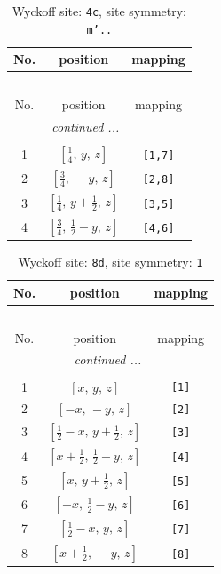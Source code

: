 \documentclass[fleqn,8pt]{jsarticle}
\begin{document}
\renewcommand{\arraystretch}{1.2}
\begin{longtable}{ccc}
\caption{Wyckoff site: {\tt 4c}, site symmetry: {\tt m'..}}
 \\
 \hline \hline
No. & position & mapping \\ \hline \endfirsthead

\multicolumn{2}{l}{\tablename\ \thetable{}} \\
 \hline \hline
No. & position & mapping \\ \hline \endhead

 \hline \hline
\multicolumn{2}{r}{\footnotesize\it continued ...} \\ \endfoot

 \hline \hline
\multicolumn{2}{r}{} \\ \endlastfoot

1 & $\left[ \frac{1}{4},\, y,\, z \right]$ & {\tt [1,7]} \\ \hline
2 & $\left[ \frac{3}{4},\, - y,\, z \right]$ & {\tt [2,8]} \\ \hline
3 & $\left[ \frac{1}{4},\, y + \frac{1}{2},\, z \right]$ & {\tt [3,5]} \\ \hline
4 & $\left[ \frac{3}{4},\, \frac{1}{2} - y,\, z \right]$ & {\tt [4,6]} \\
\end{longtable}
\renewcommand{\arraystretch}{1.2}
\begin{longtable}{ccc}
\caption{Wyckoff site: {\tt 8d}, site symmetry: {\tt 1}}
 \\
 \hline \hline
No. & position & mapping \\ \hline \endfirsthead

\multicolumn{2}{l}{\tablename\ \thetable{}} \\
 \hline \hline
No. & position & mapping \\ \hline \endhead

 \hline \hline
\multicolumn{2}{r}{\footnotesize\it continued ...} \\ \endfoot

 \hline \hline
\multicolumn{2}{r}{} \\ \endlastfoot

1 & $\left[ x,\, y,\, z \right]$ & {\tt [1]} \\ \hline
2 & $\left[ - x,\, - y,\, z \right]$ & {\tt [2]} \\ \hline
3 & $\left[ \frac{1}{2} - x,\, y + \frac{1}{2},\, z \right]$ & {\tt [3]} \\ \hline
4 & $\left[ x + \frac{1}{2},\, \frac{1}{2} - y,\, z \right]$ & {\tt [4]} \\ \hline
5 & $\left[ x,\, y + \frac{1}{2},\, z \right]$ & {\tt [5]} \\ \hline
6 & $\left[ - x,\, \frac{1}{2} - y,\, z \right]$ & {\tt [6]} \\ \hline
7 & $\left[ \frac{1}{2} - x,\, y,\, z \right]$ & {\tt [7]} \\ \hline
8 & $\left[ x + \frac{1}{2},\, - y,\, z \right]$ & {\tt [8]} \\
\end{longtable}
\end{document}
